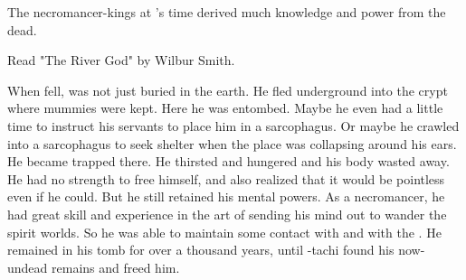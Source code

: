 The \nephil necromancer-kings at \Semiza's time derived much knowledge and power from the dead.



Read "The River God" by Wilbur Smith.

When \Thanatzil fell, \Semiza was not just buried in the earth.
He fled underground into the crypt where mummies were kept.
Here he was entombed.
Maybe he even had a little time to instruct his servants to place him in a sarcophagus. 
Or maybe he crawled into a sarcophagus to seek shelter when the place was collapsing around his ears. 
He became trapped there.
He thirsted and hungered and his body wasted away.
He had no strength to free himself, and also realized that it would be pointless even if he could.
But he still retained his mental powers.
As a necromancer, he had great skill and experience in the art of sending his mind out to wander the spirit worlds.
So he was able to maintain some contact with \Daggerrain and with the \resphain.
He remained in his tomb for over a thousand years, until \Damiarch-tachi found his now-undead remains and freed him.



